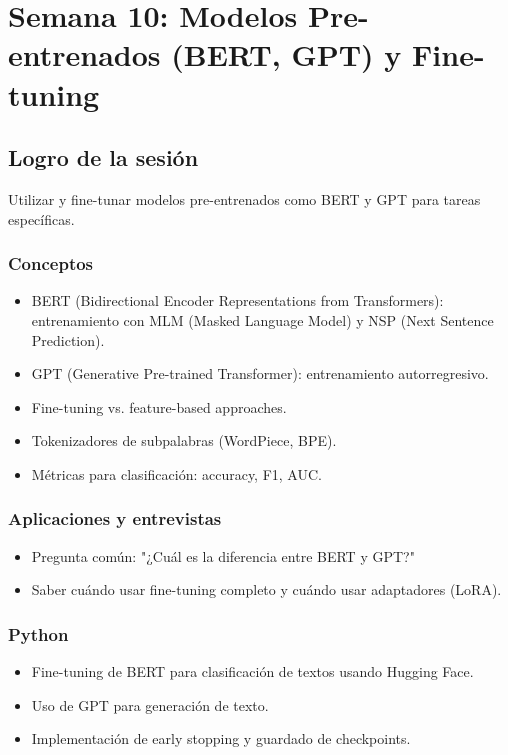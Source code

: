 \documentclass[12pt,a4paper,openany,oneside]{book}
\begin{document}
\chapter{Semana 10: Modelos Pre-entrenados (BERT, GPT) y Fine-tuning}

\section{Logro de la sesión}
Utilizar y fine-tunar modelos pre-entrenados como BERT y GPT para tareas específicas.

\subsection{Conceptos}
\begin{itemize}
    \item BERT (Bidirectional Encoder Representations from Transformers): entrenamiento con MLM (Masked Language Model) y NSP (Next Sentence Prediction).
    \item GPT (Generative Pre-trained Transformer): entrenamiento autorregresivo.
    \item Fine-tuning vs. feature-based approaches.
    \item Tokenizadores de subpalabras (WordPiece, BPE).
    \item Métricas para clasificación: accuracy, F1, AUC.
\end{itemize}

\subsection{Aplicaciones y entrevistas}
\begin{itemize}
    \item Pregunta común: "¿Cuál es la diferencia entre BERT y GPT?"
    \item Saber cuándo usar fine-tuning completo y cuándo usar adaptadores (LoRA).
\end{itemize}

\subsection{Python}
\begin{itemize}
    \item Fine-tuning de BERT para clasificación de textos usando Hugging Face.
    \item Uso de GPT para generación de texto.
    \item Implementación de early stopping y guardado de checkpoints.
\end{itemize}
\end{document}
